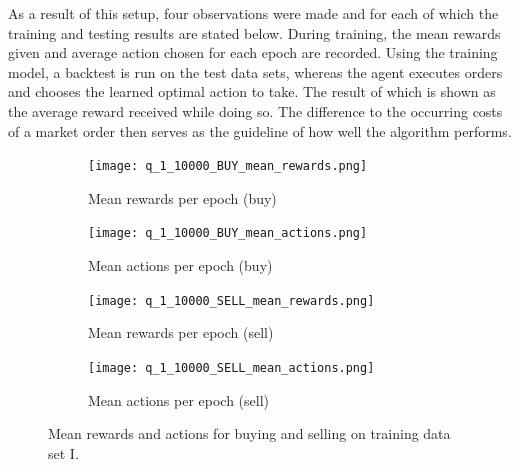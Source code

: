 As a result of this setup, four observations were made and for each of which the training and testing results are stated below.
During training, the mean rewards given and average action chosen for each epoch are recorded.
Using the training model, a backtest is run on the test data sets, whereas the agent executes orders and chooses the learned optimal action to take.
The result of which is shown as the average reward received while doing so.
The difference to the occurring costs of a market order then serves as the guideline of how well the algorithm performs.
\vfill
\newpage
\begin{figure}[H]
    \centering
    \begin{subfigure}[b]{0.45\textwidth}
        \texttt{[image: q\_1\_10000\_BUY\_mean\_rewards.png]}
        \caption{Mean rewards per epoch (buy)}
        \label{fig:analysis-q-learn-1-reward-buy}
    \end{subfigure}
    \begin{subfigure}[b]{0.45\textwidth}
        \texttt{[image: q\_1\_10000\_BUY\_mean\_actions.png]}
        \caption{Mean actions per epoch (buy)}
        \label{fig:analysis-q-learn-1-action-buy}
    \end{subfigure}
    \begin{subfigure}[b]{0.45\textwidth}
        \texttt{[image: q\_1\_10000\_SELL\_mean\_rewards.png]}
        \caption{Mean rewards per epoch (sell)}
        \label{fig:analysis-q-learn-1-reward-sell}
    \end{subfigure}
    \begin{subfigure}[b]{0.45\textwidth}
        \texttt{[image: q\_1\_10000\_SELL\_mean\_actions.png]}
        \caption{Mean actions per epoch (sell)}
        \label{fig:analysis-q-learn-1-action-sell}
    \end{subfigure}
    \caption{Mean rewards and actions for buying and selling on training data set I.}
    \label{fig:analysis-q-learn-1}
\end{figure}

